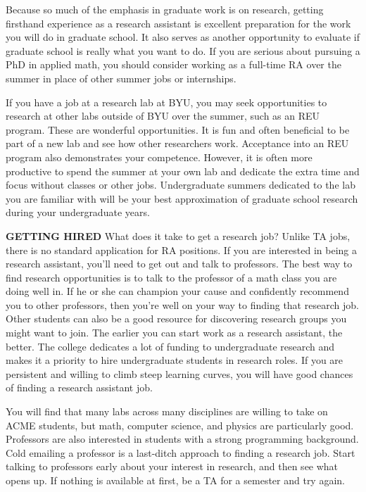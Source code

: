 \documentclass[11pt]{article}
\begin{document}
Because so much of the emphasis in graduate work is on research, getting firsthand experience as a research assistant is excellent preparation for the work you will do in graduate school. It also serves as another opportunity to evaluate if graduate school is really what you want to do. If you are serious about pursuing a PhD in applied math, you should consider working as a full-time RA over the summer in place of other summer jobs or internships.

If you have a job at a research lab at BYU, you may seek opportunities to research at other labs outside of BYU over the summer, such as an REU program. These are wonderful opportunities. It is fun and often beneficial to be part of a new lab and see how other researchers work. Acceptance into an REU program also demonstrates your competence. However, it is often more productive to spend the summer at your own lab and dedicate the extra time and focus without classes or other jobs. Undergraduate summers dedicated to the lab you are familiar with will be your best approximation of graduate school research during your undergraduate years.

\textbf{GETTING HIRED} What does it take to get a research job? Unlike TA jobs, there is no standard application for RA positions. If you are interested in being a research assistant, you’ll need to get out and talk to professors. The best way to find research opportunities is to talk to the professor of a math class you are doing well in. If he or she can champion your cause and confidently recommend you to other professors, then you’re well on your way to finding that research job. Other students can also be a good resource for discovering research groups you might want to join. The earlier you can start work as a research assistant, the better. The college dedicates a lot of funding to undergraduate research and makes it a priority to hire undergraduate students in research roles. If you are persistent and willing to climb steep learning curves, you will have good chances of finding a research assistant job. 

You will find that many labs across many disciplines are willing to take on ACME students, but math, computer science, and physics are particularly good. Professors are also interested in students with a strong programming background. Cold emailing a professor is a last-ditch approach to finding a research job. Start talking to professors early about your interest in research, and then see what opens up. If nothing is available at first, be a TA for a semester and try again.
\end{document}
